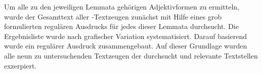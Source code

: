 Um alle zu den jeweiligen Lemmata gehörigen Adjektivformen zu ermitteln, wurde
der Gesamttext aller \KC{}-Textzeugen zunächst mit Hilfe eines grob
formulierten regulären Ausdrucks für jedes dieser Lemmata durchsucht.
% 
% 
% 
% 
Die Ergebnisliste wurde nach grafischer Variation systematisiert. Darauf
basierend wurde ein regulärer Ausdruck zusammengebaut.
% 
% 
Auf dieser Grundlage wurden alle neun zu untersuchenden Textzeugen der
\KC{} durchsucht und relevante Textstellen exzerpiert.


